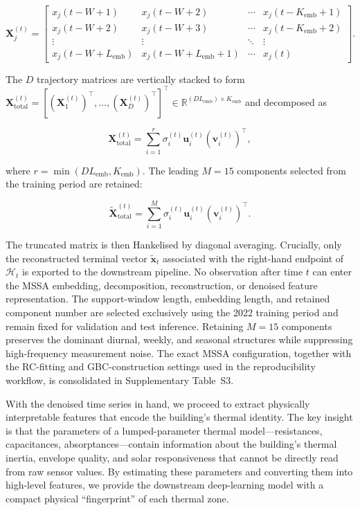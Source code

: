 \documentclass[11pt]{article}
\begin{document}
\begin{equation}
\mathbf{X}^{(t)}_j = \begin{bmatrix}
x_j(t-W+1) & x_j(t-W+2) & \cdots & x_j(t-K_{\mathrm{emb}}+1) \\
x_j(t-W+2) & x_j(t-W+3) & \cdots & x_j(t-K_{\mathrm{emb}}+2) \\
\vdots & \vdots & \ddots & \vdots \\
x_j(t-W+L_{\mathrm{emb}}) & x_j(t-W+L_{\mathrm{emb}}+1) & \cdots & x_j(t)
\end{bmatrix}.
\end{equation}

The $D$ trajectory matrices are vertically stacked to form $\mathbf{X}^{(t)}_{\mathrm{total}}=[(\mathbf{X}^{(t)}_1)^\top,\ldots,(\mathbf{X}^{(t)}_D)^\top]^\top\in\mathbb{R}^{(DL_{\mathrm{emb}})\times K_{\mathrm{emb}}}$ and decomposed as

\begin{equation}
\mathbf{X}^{(t)}_{\mathrm{total}} = \sum_{i=1}^{r} \sigma_i^{(t)}\mathbf{u}_i^{(t)}(\mathbf{v}_i^{(t)})^\top,
\end{equation}

where $r=\min(DL_{\mathrm{emb}},K_{\mathrm{emb}})$. The leading $M=15$ components selected from the training period are retained:

\begin{equation}
\widetilde{\mathbf{X}}^{(t)}_{\mathrm{total}} = \sum_{i=1}^{M} \sigma_i^{(t)}\mathbf{u}_i^{(t)}(\mathbf{v}_i^{(t)})^\top.
\end{equation}

The truncated matrix is then Hankelised by diagonal averaging. Crucially, only the reconstructed terminal vector $\widetilde{\mathbf{x}}_{t}$ associated with the right-hand endpoint of $\mathcal{H}_t$ is exported to the downstream pipeline. No observation after time $t$ can enter the MSSA embedding, decomposition, reconstruction, or denoised feature representation. The support-window length, embedding length, and retained component number are selected exclusively using the 2022 training period and remain fixed for validation and test inference. Retaining $M=15$ components preserves the dominant diurnal, weekly, and seasonal structures while suppressing high-frequency measurement noise. The exact MSSA configuration, together with the RC-fitting and GBC-construction settings used in the reproducibility workflow, is consolidated in Supplementary Table~S3.

With the denoised time series in hand, we proceed to extract physically interpretable features that encode the building's thermal identity. The key insight is that the parameters of a lumped-parameter thermal model---resistances, capacitances, absorptances---contain information about the building's thermal inertia, envelope quality, and solar responsiveness that cannot be directly read from raw sensor values. By estimating these parameters and converting them into high-level features, we provide the downstream deep-learning model with a compact physical ``fingerprint'' of each thermal zone.
\end{document}
